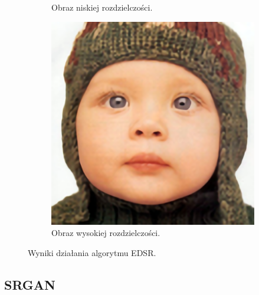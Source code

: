 \documentclass[a4paper,11pt, notitlepage ]{article}
\begin{document}
\begin{figure}[h!]
\begin{subfigure}[b]{0.4\linewidth}
 		\caption{Obraz  niskiej rozdzielczości.}
 	\end{subfigure}
 	\begin{subfigure}[b]{0.4\linewidth}
 		\includegraphics[width=\linewidth]{EDSR/EDSR_OUTPUT.png}
 		\caption{Obraz wysokiej rozdzielczości.}
 	\end{subfigure}
 	\caption{Wyniki działania algorytmu EDSR.}
 	\label{fig:coffee3}
 \end{figure}
\newpage
\subsection{SRGAN}
\end{document}
